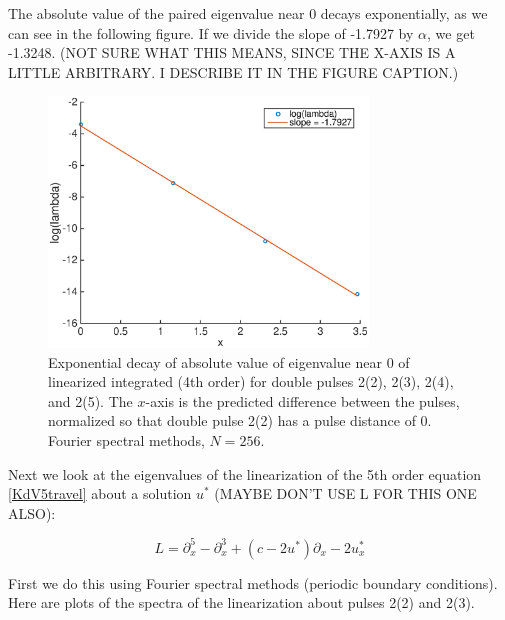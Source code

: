 \documentclass[12pt]{article}
\begin{document}
The absolute value of the paired eigenvalue near 0 decays exponentially, as we can see in the following figure. If we divide the slope of -1.7927 by $\alpha$, we get -1.3248. (NOT SURE WHAT THIS MEANS, SINCE THE X-AXIS IS A LITTLE ARBITRARY. I DESCRIBE IT IN THE FIGURE CAPTION.)
\begin{figure}[H]
	\includegraphics[width=8.5cm]{decayinteigenvalue}
	\caption{Exponential decay of absolute value of eigenvalue near 0 of linearized integrated (4th order) for double pulses 2(2), 2(3), 2(4), and 2(5). The $x$-axis is the predicted difference between the pulses, normalized so that double pulse 2(2) has a pulse distance of 0.
	Fourier spectral methods, $N = 256$.}
\end{figure}

Next we look at the eigenvalues of the linearization of the 5th order equation \eqref{KdV5travel} about a solution $u^*$ (MAYBE DON'T USE L FOR THIS ONE ALSO):

\begin{equation}\label{linear5th}
L = \partial_x^5 - \partial_x^3 + (c - 2 u^*) \partial_x - 2 u^*_x
\end{equation}


 First we do this using Fourier spectral methods (periodic boundary conditions). Here are plots of the spectra of the linearization about pulses 2(2) and 2(3).
\end{document}
